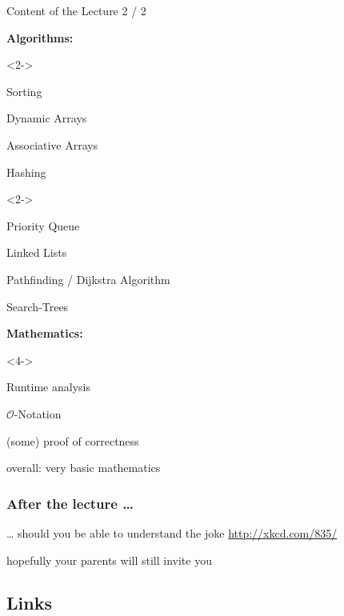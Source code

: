 \documentclass[notes=hide,pdftex,14pt]{beamer}
\begin{document}
\begin{frame}{Content of the Lecture 2 / 2}
  \begin{tabl}
  \iitem{-2em}  \textbf{Algorithms:}
\eitem 
      \begin{tabl}<2->
        \item
          Sorting
        \sitem 
        \item
          Dynamic Arrays
        \sitem 
        \item
          Associative Arrays
        \sitem 
        \item
          Hashing
      \end{tabl}
      \begin{tabl}<2->
        \item
          Priority Queue
        \sitem 
        \item
          Linked Lists
        \sitem 
        \item
          Pathfinding / Dijkstra Algorithm
        \sitem 
        \item
          Search-Trees
      \end{tabl}
        \eitem 
    \iitem{-2em}  \textbf{Mathematics:}
  \eitem 
      \begin{tabl}<4->
        \item
          Runtime analysis
        \sitem 
        \item
          $\mathcal{O}$-Notation
        \sitem 
    \item<5->  (some) proof of correctness
        \sitem 
    \item<6-> overall: very basic mathematics
    \end{tabl}
    \end{tabl}
\end{frame}

\begin{frame}
  \frametitle{After the lecture \ldots{}}
  \begin{tabl}
  \item \ldots{} should you be able to understand the joke
  \citem{}
\citem \url{http://xkcd.com/835/}
\item<2-> hopefully your parents will still invite you 
  \end{tabl}
\end{frame}



\subsection{Links}
\end{document}
